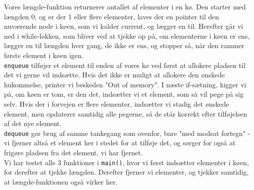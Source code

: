 Vores længde-funktion returnerer antallet af elementer i en kø. Den starter med længden 0, og er der 1 
eller flere elementer, laves der en pointer til den nuværende node i køen, som vi kalder current, og lægger 
en til. Herefter går vi ned i while-løkken, som bliver ved at tjekke op på, om elementerne i køen er ens, 
lægger en til længden hver gang, de ikke er ens, og stopper så, når den rammer første element i køen 
igen. \\

\noindent \verb+enqueue+ tilføjer et element til enden af vores kø ved først at allokere pladsen til det vi 
gerne vil indsætte. Hvis det ikke er muligt at allokere den ønskede hukommelse, printer vi beskeden "Out 
of memory". I næste if-sætning, kigger vi på, om køen er tom, er den det, indsætter vi et element, som så
vil pege på sig selv. Hvis der i forvejen er flere elementer, indsætter vi stadig det ønskede element, men 
opdaterer samtidig alle pegerne, så de står korrekt efter tilføjelsen af det nye element. \\

\noindent \verb+dequeue+ gør brug af samme tankegang som ovenfor, bare "med modsat fortegn" - vi 
fjerner altså et element her i stedet for at tilføje det, og sørger for også at frigøre pladsen fra det element, 
vi har fjernet.\\

\noindent Vi har testet alle 3 funktioner i \verb+main()+, hvor vi først indsætter elementer i køen, for derefter
at tjekke længden. Derefter fjerner vi elementer, og tjekker samtidig, at længde-funktionen også virker her.